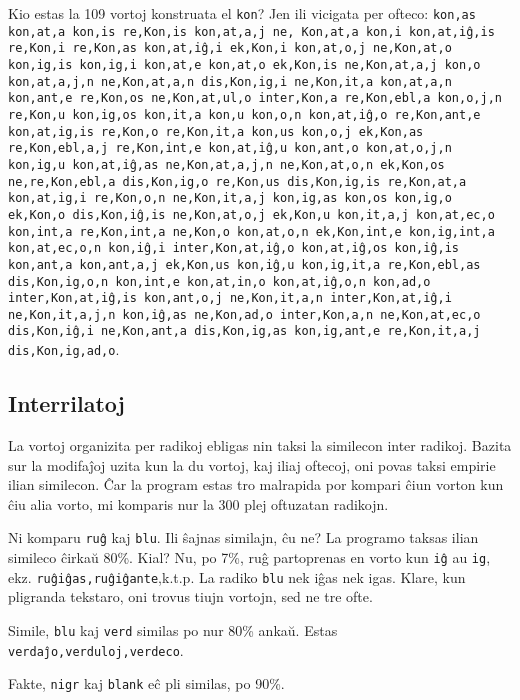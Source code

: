 \documentclass[12pt,twoside]{article}
\begin{document}
Kio estas la 109 vortoj konstruata el \texttt{kon}? Jen ili vicigata per ofteco: \texttt{kon,as kon,at,a kon,is re,Kon,is kon,at,a,j ne,
Kon,at,a kon,i kon,at,iĝ,is re,Kon,i re,Kon,as kon,at,iĝ,i ek,Kon,i kon,at,o,j ne,Kon,at,o kon,ig,is kon,ig,i kon,at,e kon,at,o ek,Kon,is 
ne,Kon,at,a,j kon,o kon,at,a,j,n ne,Kon,at,a,n dis,Kon,ig,i ne,Kon,it,a kon,at,a,n kon,ant,e re,Kon,os ne,Kon,at,ul,o inter,Kon,a 
re,Kon,ebl,a kon,o,j,n re,Kon,u kon,ig,os kon,it,a kon,u kon,o,n kon,at,iĝ,o re,Kon,ant,e kon,at,ig,is re,Kon,o re,Kon,it,a kon,us 
kon,o,j ek,Kon,as re,Kon,ebl,a,j re,Kon,int,e kon,at,iĝ,u kon,ant,o kon,at,o,j,n kon,ig,u kon,at,iĝ,as ne,Kon,at,a,j,n ne,Kon,at,o,n 
ek,Kon,os ne,re,Kon,ebl,a dis,Kon,ig,o re,Kon,us dis,Kon,ig,is re,Kon,at,a kon,at,ig,i re,Kon,o,n ne,Kon,it,a,j kon,ig,as kon,os kon,ig,o 
ek,Kon,o dis,Kon,iĝ,is ne,Kon,at,o,j ek,Kon,u kon,it,a,j kon,at,ec,o kon,int,a re,Kon,int,a ne,Kon,o kon,at,o,n ek,Kon,int,e kon,ig,int,a 
kon,at,ec,o,n kon,iĝ,i inter,Kon,at,iĝ,o kon,at,iĝ,os kon,iĝ,is kon,ant,a kon,ant,a,j ek,Kon,us kon,iĝ,u kon,ig,it,a re,Kon,ebl,as 
dis,Kon,ig,o,n kon,int,e kon,at,in,o kon,at,iĝ,o,n kon,ad,o inter,Kon,at,iĝ,is kon,ant,o,j ne,Kon,it,a,n inter,Kon,at,iĝ,i ne,Kon,it,a,j,n 
kon,iĝ,as ne,Kon,ad,o inter,Kon,a,n ne,Kon,at,ec,o dis,Kon,iĝ,i ne,Kon,ant,a dis,Kon,ig,as kon,ig,ant,e re,Kon,it,a,j dis,Kon,ig,ad,o}.

\subsection{Interrilatoj}

La vortoj organizita per radikoj ebligas nin taksi la similecon inter radikoj. Bazita sur la modifaĵoj uzita kun la du vortoj, kaj
iliaj oftecoj, oni povas taksi empirie ilian similecon.
Ĉar la program estas tro malrapida por kompari ĉiun vorton kun ĉiu alia vorto, mi komparis nur la 300 plej oftuzatan radikojn.

Ni komparu \texttt{ruĝ} kaj \texttt{blu}. Ili ŝajnas similajn, ĉu ne? La programo taksas ilian simileco 
ĉirkaŭ 80\%. Kial? Nu, po 7\%, ruĝ partoprenas en vorto kun \texttt{iĝ} au \texttt{ig}, ekz. \texttt{ruĝiĝas,ruĝiĝante},k.t.p. 
La radiko \texttt{blu} nek iĝas nek igas. Klare, kun pligranda tekstaro, oni trovus tiujn vortojn, sed ne tre ofte.

Simile, \texttt{blu} kaj \texttt{verd} similas po nur 80\% ankaŭ. Estas \texttt{verdaĵo,verduloj,verdeco}.

Fakte, \texttt{nigr} kaj \texttt{blank} eĉ pli similas, po 90\%. 
\end{document}
